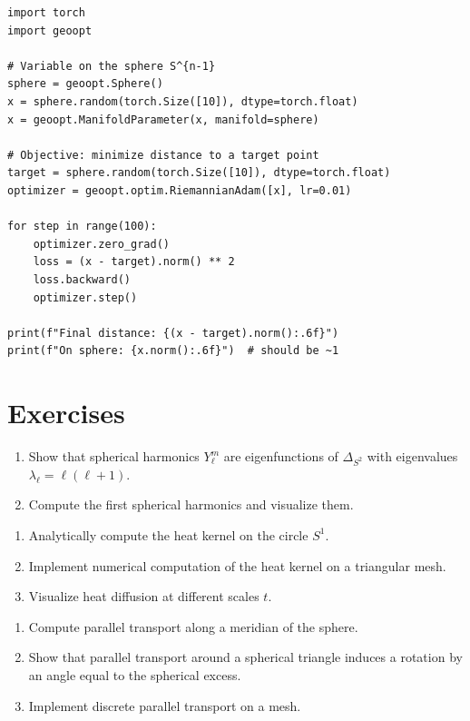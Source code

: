 \begin{codeblock}[title=\textbf{Optimization on the sphere with geoopt}]
\begin{verbatim}
import torch
import geoopt

# Variable on the sphere S^{n-1}
sphere = geoopt.Sphere()
x = sphere.random(torch.Size([10]), dtype=torch.float)
x = geoopt.ManifoldParameter(x, manifold=sphere)

# Objective: minimize distance to a target point
target = sphere.random(torch.Size([10]), dtype=torch.float)
optimizer = geoopt.optim.RiemannianAdam([x], lr=0.01)

for step in range(100):
    optimizer.zero_grad()
    loss = (x - target).norm() ** 2
    loss.backward()
    optimizer.step()

print(f"Final distance: {(x - target).norm():.6f}")
print(f"On sphere: {x.norm():.6f}")  # should be ~1
\end{verbatim}
\end{codeblock}

\section*{Exercises}

\begin{exercise}
\begin{enumerate}
    \item Show that spherical harmonics $Y_\ell^m$ are eigenfunctions of
          $\Delta_{S^2}$ with eigenvalues $\lambda_\ell = \ell(\ell+1)$.
    \item Compute the first spherical harmonics and visualize them.
\end{enumerate}
\end{exercise}

\begin{exercise}
\begin{enumerate}
    \item Analytically compute the heat kernel on the circle $S^1$.
    \item Implement numerical computation of the heat kernel on a triangular mesh.
    \item Visualize heat diffusion at different scales $t$.
\end{enumerate}
\end{exercise}

\begin{exercise}
\begin{enumerate}
    \item Compute parallel transport along a meridian of the sphere.
    \item Show that parallel transport around a spherical triangle induces a
          rotation by an angle equal to the spherical excess.
    \item Implement discrete parallel transport on a mesh.
\end{enumerate}
\end{exercise}

